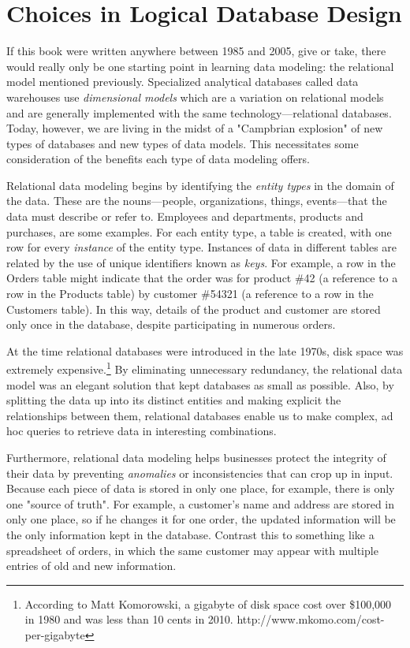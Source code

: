 \documentclass[11pt]{book}
\newcommand{\term}[1]{\emph{#1}} %
\begin{document}
\section{Choices in Logical Database Design}

If this book were written anywhere between 1985 and 2005, give or take, there would really only be one starting point in learning data modeling: the relational model mentioned previously.  Specialized analytical databases called data warehouses use \term{dimensional models} which are a variation on relational models and are generally implemented with the same technology---relational databases.  Today, however, we are living in the midst of a "Campbrian explosion" of new types of databases and new types of data models.  This necessitates some consideration of the benefits each type of data modeling offers.

Relational data modeling begins by identifying the \term{entity types} in the domain of the data.  These are the nouns---people, organizations, things, events---that the data must describe or refer to.  Employees and departments, products and purchases, are some examples.  For each entity type, a table is created, with one row for every \term{instance} of the entity type.  Instances of data in different tables are related by the use of unique identifiers known as \term{keys}.  For example, a row in the Orders table might indicate that the order was for product \#42 (a reference to a row in the Products table) by customer \#54321 (a reference to a row in the Customers table).  In this way, details of the product and customer are stored only once in the database, despite participating in numerous orders.

At the time relational databases were introduced in the late 1970s, disk space was extremely expensive.\footnote{According to Matt Komorowski, a gigabyte of disk space cost over \$100,000 in 1980 and was less than 10 cents in 2010. http://www.mkomo.com/cost-per-gigabyte}  By eliminating unnecessary redundancy, the relational data model was an elegant solution that kept databases as small as possible.  Also, by splitting the data up into its distinct entities and making explicit the relationships between them, relational databases enable us to make complex, ad hoc queries to retrieve data in interesting combinations.  

Furthermore, relational data modeling helps businesses protect the integrity of their data by preventing \term{anomalies} or inconsistencies that can crop up in input.  Because each piece of data is stored in only one place, for example, there is only one "source of truth".  For example, a customer's name and address are stored in only one place, so if he changes it for one order, the updated information will be the only information kept in the database.  Contrast this to something like a spreadsheet of orders, in which the same customer may appear with multiple entries of old and new information.
\end{document}
